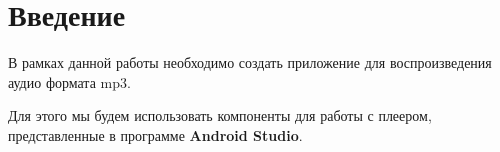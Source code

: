 \chapter*{Введение}
\label{ch:intro}

    В рамках данной работы необходимо создать приложение для воспроизведения аудио формата mp3.

    Для этого мы будем использовать компоненты для работы с плеером, представленные в программе \textbf{Android Studio}.

\endinput